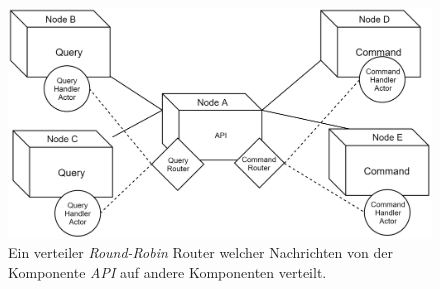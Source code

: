 \begin{figure}
    \centering
    \includegraphics[width=\linewidth]{gfx/implementation/ClusterRouter}
    \caption{Ein verteiler \textit{Round-Robin} Router welcher Nachrichten von der Komponente \textit{API} auf andere Komponenten verteilt.}
    \label{fig:implementation:routing}
\end{figure} 



